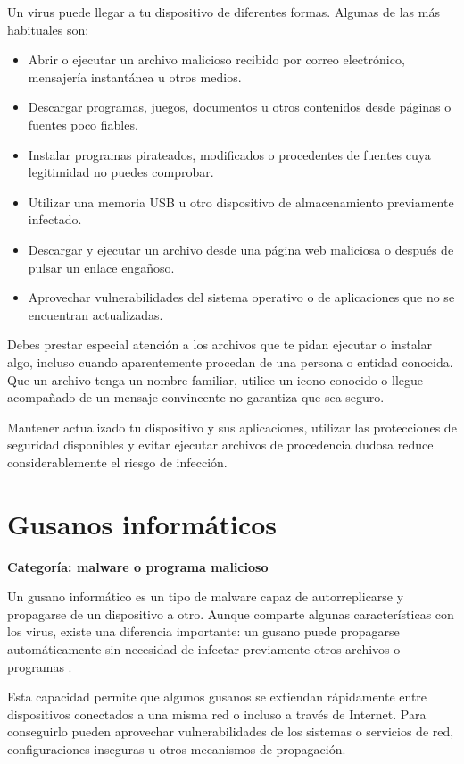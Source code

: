 \documentclass[
  spanish,
  a4paper,
  openany]{book}
\begin{document}
Un virus puede llegar a tu dispositivo de diferentes formas. Algunas de las más habituales son:

\begin{itemize}
\item
  Abrir o ejecutar un archivo malicioso recibido por correo electrónico, mensajería instantánea u otros medios.
\item
  Descargar programas, juegos, documentos u otros contenidos desde páginas o fuentes poco fiables.
\item
  Instalar programas pirateados, modificados o procedentes de fuentes cuya legitimidad no puedes comprobar.
\item
  Utilizar una memoria USB u otro dispositivo de almacenamiento previamente infectado.
\item
  Descargar y ejecutar un archivo desde una página web maliciosa o después de pulsar un enlace engañoso.
\item
  Aprovechar vulnerabilidades del sistema operativo o de aplicaciones que no se encuentran actualizadas.
\end{itemize}

Debes prestar especial atención a los archivos que te pidan ejecutar o instalar algo, incluso cuando aparentemente procedan de una persona o entidad conocida. Que un archivo tenga un nombre familiar, utilice un icono conocido o llegue acompañado de un mensaje convincente no garantiza que sea seguro.

Mantener actualizado tu dispositivo y sus aplicaciones, utilizar las protecciones de seguridad disponibles y evitar ejecutar archivos de procedencia dudosa reduce considerablemente el riesgo de infección.

\section{Gusanos informáticos}\label{gusanos-informuxe1ticos}

\textbf{Categoría: malware o programa malicioso}

Un gusano informático es un tipo de malware capaz de autorreplicarse y propagarse de un dispositivo a otro. Aunque comparte algunas características con los virus, existe una diferencia importante: un gusano puede propagarse automáticamente sin necesidad de infectar previamente otros archivos o programas \citep{PANDA-gusano}.

Esta capacidad permite que algunos gusanos se extiendan rápidamente entre dispositivos conectados a una misma red o incluso a través de Internet. Para conseguirlo pueden aprovechar vulnerabilidades de los sistemas o servicios de red, configuraciones inseguras u otros mecanismos de propagación.
\end{document}
